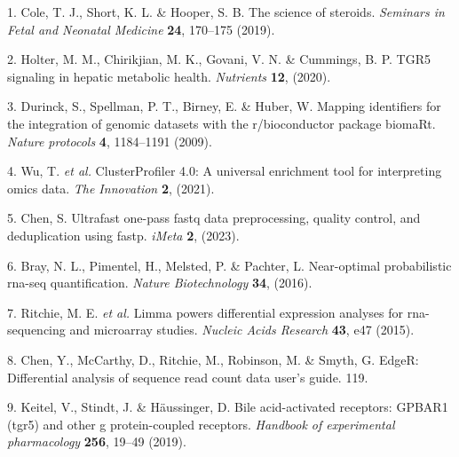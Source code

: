 \documentclass[
]{article}
\newenvironment{cslreferences}%
  {}%
  {\par}
\begin{document}
\hypertarget{refs}{}
\begin{cslreferences}
\leavevmode\hypertarget{ref-TheScienceOfCole2019}{}%
1. Cole, T. J., Short, K. L. \& Hooper, S. B. The science of steroids. \emph{Seminars in Fetal and Neonatal Medicine} \textbf{24}, 170--175 (2019).

\leavevmode\hypertarget{ref-Tgr5SignalingHolter2020}{}%
2. Holter, M. M., Chirikjian, M. K., Govani, V. N. \& Cummings, B. P. TGR5 signaling in hepatic metabolic health. \emph{Nutrients} \textbf{12}, (2020).

\leavevmode\hypertarget{ref-MappingIdentifDurinc2009}{}%
3. Durinck, S., Spellman, P. T., Birney, E. \& Huber, W. Mapping identifiers for the integration of genomic datasets with the r/bioconductor package biomaRt. \emph{Nature protocols} \textbf{4}, 1184--1191 (2009).

\leavevmode\hypertarget{ref-ClusterprofilerWuTi2021}{}%
4. Wu, T. \emph{et al.} ClusterProfiler 4.0: A universal enrichment tool for interpreting omics data. \emph{The Innovation} \textbf{2}, (2021).

\leavevmode\hypertarget{ref-UltrafastOnePChen2023}{}%
5. Chen, S. Ultrafast one-pass fastq data preprocessing, quality control, and deduplication using fastp. \emph{iMeta} \textbf{2}, (2023).

\leavevmode\hypertarget{ref-NearOptimalPrBray2016}{}%
6. Bray, N. L., Pimentel, H., Melsted, P. \& Pachter, L. Near-optimal probabilistic rna-seq quantification. \emph{Nature Biotechnology} \textbf{34}, (2016).

\leavevmode\hypertarget{ref-LimmaPowersDiRitchi2015}{}%
7. Ritchie, M. E. \emph{et al.} Limma powers differential expression analyses for rna-sequencing and microarray studies. \emph{Nucleic Acids Research} \textbf{43}, e47 (2015).

\leavevmode\hypertarget{ref-EdgerDifferenChen}{}%
8. Chen, Y., McCarthy, D., Ritchie, M., Robinson, M. \& Smyth, G. EdgeR: Differential analysis of sequence read count data user's guide. 119.

\leavevmode\hypertarget{ref-BileAcidActivKeitel2019}{}%
9. Keitel, V., Stindt, J. \& Häussinger, D. Bile acid-activated receptors: GPBAR1 (tgr5) and other g protein-coupled receptors. \emph{Handbook of experimental pharmacology} \textbf{256}, 19--49 (2019).
\end{cslreferences}
\end{document}
